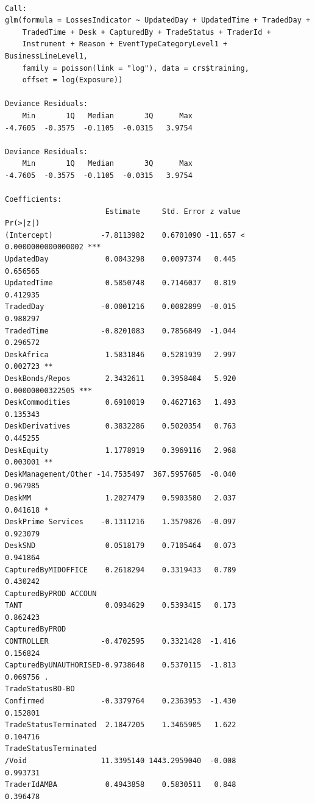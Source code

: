 \documentclass[
]{article}
\begin{document}
\begin{verbatim}

Call:
glm(formula = LossesIndicator ~ UpdatedDay + UpdatedTime + TradedDay + 
    TradedTime + Desk + CapturedBy + TradeStatus + TraderId + 
    Instrument + Reason + EventTypeCategoryLevel1 + BusinessLineLevel1, 
    family = poisson(link = "log"), data = crs$training, 
    offset = log(Exposure))

Deviance Residuals: 
    Min       1Q   Median       3Q      Max  
-4.7605  -0.3575  -0.1105  -0.0315   3.9754  

Deviance Residuals: 
    Min       1Q   Median       3Q      Max  
-4.7605  -0.3575  -0.1105  -0.0315   3.9754  

Coefficients:
                       Estimate     Std. Error z value             Pr(>|z|)    
(Intercept)           -7.8113982    0.6701090 -11.657 < 0.0000000000000002 ***
UpdatedDay             0.0043298    0.0097374   0.445             0.656565    
UpdatedTime            0.5850748    0.7146037   0.819             0.412935    
TradedDay             -0.0001216    0.0082899  -0.015             0.988297    
TradedTime            -0.8201083    0.7856849  -1.044             0.296572    
DeskAfrica             1.5831846    0.5281939   2.997             0.002723 ** 
DeskBonds/Repos        2.3432611    0.3958404   5.920     0.00000000322505 ***
DeskCommodities        0.6910019    0.4627163   1.493             0.135343    
DeskDerivatives        0.3832286    0.5020354   0.763             0.445255    
DeskEquity             1.1778919    0.3969116   2.968             0.003001 ** 
DeskManagement/Other -14.7535497  367.5957685  -0.040             0.967985    
DeskMM                 1.2027479    0.5903580   2.037             0.041618 *  
DeskPrime Services    -0.1311216    1.3579826  -0.097             0.923079    
DeskSND                0.0518179    0.7105464   0.073             0.941864    
CapturedByMIDOFFICE    0.2618294    0.3319433   0.789             0.430242    
CapturedByPROD ACCOUN
TANT                   0.0934629    0.5393415   0.173             0.862423    
CapturedByPROD 
CONTROLLER            -0.4702595    0.3321428  -1.416             0.156824    
CapturedByUNAUTHORISED-0.9738648    0.5370115  -1.813             0.069756 .  
TradeStatusBO-BO 
Confirmed             -0.3379764    0.2363953  -1.430             0.152801    
TradeStatusTerminated  2.1847205    1.3465905   1.622             0.104716    
TradeStatusTerminated
/Void                 11.3395140 1443.2959040  -0.008             0.993731    
TraderIdAMBA           0.4943858    0.5830511   0.848             0.396478    

\end{verbatim}
\end{document}
